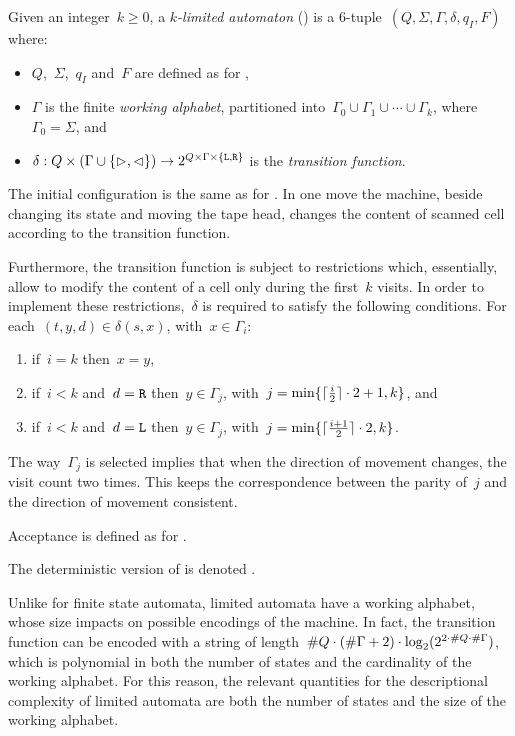 \begin{defn}\label{def:kla}
	Given an integer~$k\ge0$, a \emph{$k$-limited automaton} (\kLA) is a 6-tuple~$(Q,\Sigma,\Gamma,\delta,q_I,F)$ where:
	\begin{itemize}
		\item $Q$,~$\Sigma$,~$q_I$ and~$F$ are defined as for \TNFAs,
		\item $\Gamma$ is the finite \emph{working alphabet}, partitioned into~$\Gamma_0\cup\Gamma_1\cup\cdots\cup\Gamma_k$, where~$\Gamma_0=\Sigma$, and
		\item $\delta:Q\times(\Gamma\cup\{\rhd,\lhd\})\to2^{Q\times\Gamma\times\{\mathtt L,\mathtt R\}}$ is the \emph{transition function}.
	\end{itemize}
	The initial configuration is the same as for \TNFAs.
	In one move the machine, beside changing its state and moving the tape head, changes the content of scanned cell according to the transition function.

	Furthermore, the transition function is subject to restrictions which, essentially, allow to modify the content of a cell only during the first~$k$ visits.
	In order to implement these restrictions,~$\delta$ is required to satisfy the following conditions. For each~$(t,y,d)\in\delta(s,x)$, with~$x\in\Gamma_i$:
	\begin{enumerate}[(1)]
		\item if~$i=k$ then~$x=y$,
		\item if~$i<k$ and~$d=\mathtt R$ then~$y\in\Gamma_j$, with~$j=\min\{\lceil \frac{i}{2} \rceil\cdot 2+1,k\}$, and
		\item if~$i<k$ and~$d=\mathtt L$ then~$y\in\Gamma_j$, with~$j=\min\{\lceil \frac{i+1}{2} \rceil\cdot 2,k\}$.
	\end{enumerate}
	The way~$\Gamma_j$ is selected implies that when the direction of movement changes, the visit count two times.
	This keeps the correspondence between the parity of~$j$ and the direction of movement consistent.

	\noindent Acceptance is defined as for \TNFAs.

	\noindent The deterministic version of \kLAs is denoted \kDLAs.
\end{defn}

Unlike for finite state automata, limited automata have a working alphabet, whose size impacts on possible encodings of the machine.
In fact, the transition function can be encoded with a string of length~$\# Q\cdot(\# \Gamma+2)\cdot\log_2(2^{2\cdot\# Q\cdot\# \Gamma})$, which is polynomial in both the number of states and the cardinality of the working alphabet.
For this reason, the relevant quantities for the descriptional complexity of limited automata are both the number of states and the size of the working alphabet.


